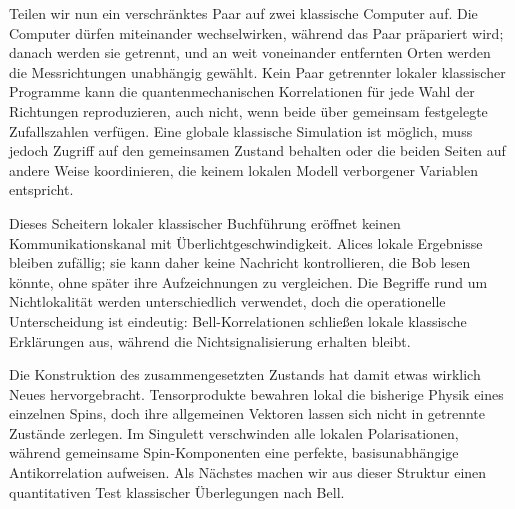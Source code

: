Teilen wir nun ein verschränktes Paar auf zwei klassische Computer auf. Die Computer dürfen miteinander wechselwirken, während das Paar präpariert wird; danach werden sie getrennt, und an weit voneinander entfernten Orten werden die Messrichtungen unabhängig gewählt. Kein Paar getrennter lokaler klassischer Programme kann die quantenmechanischen Korrelationen für jede Wahl der Richtungen reproduzieren, auch nicht, wenn beide über gemeinsam festgelegte Zufallszahlen verfügen. Eine globale klassische Simulation ist möglich, muss jedoch Zugriff auf den gemeinsamen Zustand behalten oder die beiden Seiten auf andere Weise koordinieren, die keinem lokalen Modell verborgener Variablen entspricht.

Dieses Scheitern lokaler klassischer Buchführung eröffnet keinen Kommunikationskanal mit Überlichtgeschwindigkeit. Alices lokale Ergebnisse bleiben zufällig; sie kann daher keine Nachricht kontrollieren, die Bob lesen könnte, ohne später ihre Aufzeichnungen zu vergleichen. Die Begriffe rund um Nichtlokalität werden unterschiedlich verwendet, doch die operationelle Unterscheidung ist eindeutig: Bell-Korrelationen schließen lokale klassische Erklärungen aus, während die Nichtsignalisierung erhalten bleibt.

Die Konstruktion des zusammengesetzten Zustands hat damit etwas wirklich Neues hervorgebracht. Tensorprodukte bewahren lokal die bisherige Physik eines einzelnen Spins, doch ihre allgemeinen Vektoren lassen sich nicht in getrennte Zustände zerlegen. Im Singulett verschwinden alle lokalen Polarisationen, während gemeinsame Spin-Komponenten eine perfekte, basisunabhängige Antikorrelation aufweisen. Als Nächstes machen wir aus dieser Struktur einen quantitativen Test klassischer Überlegungen nach Bell.
